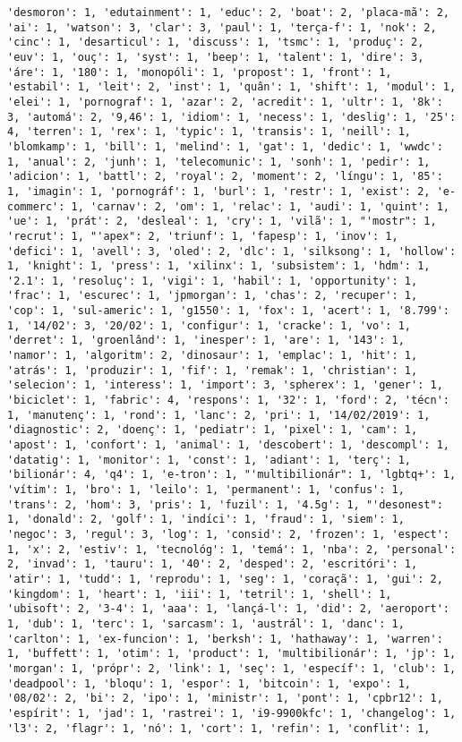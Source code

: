 \documentclass[11pt]{article}
\begin{document}
\begin{Verbatim}[commandchars=\\\{\}]
'desmoron': 1, 'edutainment': 1, 'educ': 2, 'boat': 2, 'placa-mã': 2, 'ai': 1, 'watson': 3, 'clar': 3, 'paul': 1, 'terça-f': 1, 'nok': 2, 'cinc': 1, 'desarticul': 1, 'discuss': 1, 'tsmc': 1, 'produç': 2, 'euv': 1, 'ouç': 1, 'syst': 1, 'beep': 1, 'talent': 1, 'dire': 3, 'áre': 1, '180': 1, 'monopóli': 1, 'propost': 1, 'front': 1, 'estabil': 1, 'leit': 2, 'inst': 1, 'quân': 1, 'shift': 1, 'modul': 1, 'elei': 1, 'pornograf': 1, 'azar': 2, 'acredit': 1, 'ultr': 1, '8k': 3, 'automá': 2, '9,46': 1, 'idiom': 1, 'necess': 1, 'deslig': 1, '25': 4, 'terren': 1, 'rex': 1, 'typic': 1, 'transis': 1, 'neill': 1, 'blomkamp': 1, 'bill': 1, 'melind': 1, 'gat': 1, 'dedic': 1, 'wwdc': 1, 'anual': 2, 'junh': 1, 'telecomunic': 1, 'sonh': 1, 'pedir': 1, 'adicion': 1, 'battl': 2, 'royal': 2, 'moment': 2, 'língu': 1, '85': 1, 'imagin': 1, 'pornográf': 1, 'burl': 1, 'restr': 1, 'exist': 2, 'e-commerc': 1, 'carnav': 2, 'om': 1, 'relac': 1, 'audi': 1, 'quint': 1, 'ue': 1, 'prát': 2, 'desleal': 1, 'cry': 1, 'vilã': 1, "'mostr": 1, 'recrut': 1, "'apex": 2, 'triunf': 1, 'fapesp': 1, 'inov': 1, 'defici': 1, 'avell': 3, 'oled': 2, 'dlc': 1, 'silksong': 1, 'hollow': 1, 'knight': 1, 'press': 1, 'xilinx': 1, 'subsistem': 1, 'hdm': 1, '2.1': 1, 'resoluç': 1, 'vigi': 1, 'habil': 1, 'opportunity': 1, 'frac': 1, 'escurec': 1, 'jpmorgan': 1, 'chas': 2, 'recuper': 1, 'cop': 1, 'sul-americ': 1, 'g1550': 1, 'fox': 1, 'acert': 1, '8.799': 1, '14/02': 3, '20/02': 1, 'configur': 1, 'cracke': 1, 'vo': 1, 'derret': 1, 'groenlând': 1, 'inesper': 1, 'are': 1, '143': 1, 'namor': 1, 'algoritm': 2, 'dinosaur': 1, 'emplac': 1, 'hit': 1, 'atrás': 1, 'produzir': 1, 'fif': 1, 'remak': 1, 'christian': 1, 'selecion': 1, 'interess': 1, 'import': 3, 'spherex': 1, 'gener': 1, 'biciclet': 1, 'fabric': 4, 'respons': 1, '32': 1, 'ford': 2, 'técn': 1, 'manutenç': 1, 'rond': 1, 'lanc': 2, 'pri': 1, '14/02/2019': 1, 'diagnostic': 2, 'doenç': 1, 'pediatr': 1, 'pixel': 1, 'cam': 1, 'apost': 1, 'confort': 1, 'animal': 1, 'descobert': 1, 'descompl': 1, 'datatig': 1, 'monitor': 1, 'const': 1, 'adiant': 1, 'terç': 1, 'bilionár': 4, 'q4': 1, 'e-tron': 1, "'multibilionár": 1, 'lgbtq+': 1, 'vítim': 1, 'bro': 1, 'leilo': 1, 'permanent': 1, 'confus': 1, 'trans': 2, 'hom': 3, 'pris': 1, 'fuzil': 1, '4.5g': 1, "'desonest": 1, 'donald': 2, 'golf': 1, 'indíci': 1, 'fraud': 1, 'siem': 1, 'negoc': 3, 'regul': 3, 'log': 1, 'consid': 2, 'frozen': 1, 'espect': 1, 'x': 2, 'estiv': 1, 'tecnológ': 1, 'temá': 1, 'nba': 2, 'personal': 2, 'invad': 1, 'tauru': 1, '40': 2, 'desped': 2, 'escritóri': 1, 'atir': 1, 'tudd': 1, 'reprodu': 1, 'seg': 1, 'coraçã': 1, 'gui': 2, 'kingdom': 1, 'heart': 1, 'iii': 1, 'tetril': 1, 'shell': 1, 'ubisoft': 2, '3-4': 1, 'aaa': 1, 'lançá-l': 1, 'did': 2, 'aeroport': 1, 'dub': 1, 'terc': 1, 'sarcasm': 1, 'austrál': 1, 'danc': 1, 'carlton': 1, 'ex-funcion': 1, 'berksh': 1, 'hathaway': 1, 'warren': 1, 'buffett': 1, 'otim': 1, 'product': 1, 'multibilionár': 1, 'jp': 1, 'morgan': 1, 'própr': 2, 'link': 1, 'seç': 1, 'específ': 1, 'club': 1, 'deadpool': 1, 'bloqu': 1, 'espor': 1, 'bitcoin': 1, 'expo': 1, '08/02': 2, 'bi': 2, 'ipo': 1, 'ministr': 1, 'pont': 1, 'cpbr12': 1, 'espírit': 1, 'jad': 1, 'rastrei': 1, 'i9-9900kfc': 1, 'changelog': 1, 'l3': 2, 'flagr': 1, 'nó': 1, 'cort': 1, 'refin': 1, 'conflit': 1, 
\end{Verbatim}
\end{document}
